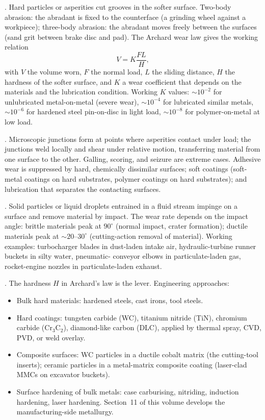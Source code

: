 . Hard particles or asperities cut grooves in
the softer surface. Two-body abrasion: the abradant is fixed to the
counterface (a grinding wheel against a workpiece); three-body
abrasion: the abradant moves freely between the surfaces (sand grit
between brake disc and pad). The Archard wear law gives the working
relation
\[
V = K \frac{F L}{H},
\]
with $V$ the volume worn, $F$ the normal load, $L$ the sliding
distance, $H$ the hardness of the softer surface, and $K$ a wear
coefficient that depends on the materials and the lubrication
condition. Working $K$ values: $\sim 10^{-2}$ for unlubricated
metal-on-metal (severe wear), $\sim 10^{-4}$ for lubricated similar
metals, $\sim 10^{-6}$ for hardened steel pin-on-disc in light
load, $\sim 10^{-8}$ for polymer-on-metal at low load.

. Microscopic junctions form at points where
asperities contact under load; the junctions weld locally and shear
under relative motion, transferring material from one surface to the
other. Galling, scoring, and seizure are extreme cases. Adhesive wear
is suppressed by hard, chemically dissimilar surfaces; soft coatings
(soft-metal coatings on hard substrates, polymer coatings on hard
substrates); and lubrication that separates the contacting surfaces.

. Solid particles or liquid droplets entrained
in a fluid stream impinge on a surface and remove material by
impact. The wear rate depends on the impact angle: brittle materials
peak at $90^\circ$ (normal impact, crater formation); ductile
materials peak at $\sim 20$--$30^\circ$ (cutting-action removal of
material). Working examples: turbocharger blades in dust-laden intake
air, hydraulic-turbine runner buckets in silty water, pneumatic-
conveyor elbows in particulate-laden gas, rocket-engine nozzles in
particulate-laden exhaust.

. The hardness $H$ in
Archard's law is the lever. Engineering approaches:

\begin{itemize}[leftmargin=*]
\item Bulk hard materials: hardened steels, cast irons, tool steels.
\item Hard coatings: tungsten carbide (WC), titanium nitride (TiN),
  chromium carbide (Cr$_3$C$_2$), diamond-like carbon (DLC), applied
  by thermal spray, CVD, PVD, or weld overlay.
\item Composite surfaces: WC particles in a ductile cobalt matrix
  (the cutting-tool inserts); ceramic particles in a metal-matrix
  composite coating (laser-clad MMCs on excavator buckets).
\item Surface hardening of bulk metals: case carburising, nitriding,
  induction hardening, laser hardening. Section~11 of this volume
  develops the manufacturing-side metallurgy.
\end{itemize}

